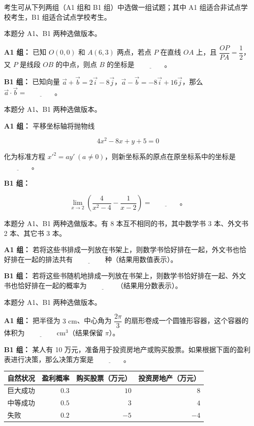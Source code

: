考生可从下列两组（A1 组和 B1 组）中选做一组试题；其中 A1 组适合非试点学校考生，B1 组适合试点学校考生。

\begin{question}
本题分 A1、B1 两种选做版本。

\textbf{A1 组：} 已知 $O(0,0)$ 和 $A(6,3)$ 两点，若点 $P$ 在直线 $OA$ 上，且 $\dfrac{OP}{PA}=\dfrac12$，又 $P$ 是线段 $OB$ 的中点，则点 $B$ 的坐标是 $\underline{\qquad\qquad}$。

\textbf{B1 组：} 已知向量 $\vec a+\vec b=2\vec i-8\vec j$，$\vec a-\vec b=-8\vec i+16\vec j$，那么 $\vec a\cdot\vec b=\underline{\qquad\qquad}$。

\end{question}
\begin{question}
本题分 A1、B1 两种选做版本。

\textbf{A1 组：} 平移坐标轴将抛物线

\nopagebreak[4]
\[
4x^2-8x+y+5=0
\]

化为标准方程 $x'^2=ay'\ (a\ne0)$，则新坐标系的原点在原坐标系中的坐标是 $\underline{\qquad\qquad}$。

\textbf{B1 组：}

\nopagebreak[4]
\[
\lim_{x\to2}\left(\dfrac{4}{x^2-4}-\dfrac{1}{x-2}\right)=\underline{\qquad\qquad}\mbox{。}
\]

\end{question}
\begin{question}
本题分 A1、B1 两种选做版本。有 8 本互不相同的书，其中数学书 3 本、外文书 2 本、其它书 3 本。

\textbf{A1 组：} 若将这些书排成一列放在书架上，则数学书恰好排在一起，外文书也恰好排在一起的排法共有 $\underline{\qquad\qquad}$ 种（结果用数值表示）。

\textbf{B1 组：} 若将这些书随机地排成一列放在书架上，则数学书恰好排在一起、外文书也恰好排在一起的概率为 $\underline{\qquad\qquad}$（结果用分数表示）。

\end{question}
\begin{question}
本题分 A1、B1 两种选做版本。

\textbf{A1 组：} 把半径为 $3\text{ cm}$、中心角为 $\dfrac{2\pi}{3}$ 的扇形卷成一个圆锥形容器，这个容器的体积为 $\underline{\qquad\qquad}\text{ cm}^3$（结果保留 $\pi$）。

\textbf{B1 组：} 某人有 10 万元，准备用于投资房地产或购买股票。如果根据下面的盈利表进行决策，那么决策方案是 $\underline{\qquad\qquad}$。

\begin{center}
\begin{tabular}{lrrr}
\toprule
自然状况 & 盈利概率 & 购买股票（万元） & 投资房地产（万元） \\
\midrule
巨大成功 & $0.3$ & $10$ & $8$ \\
中等成功 & $0.5$ & $3$ & $4$ \\
失败 & $0.2$ & $-5$ & $-4$ \\
\bottomrule
\end{tabular}
\end{center}

\end{question}

